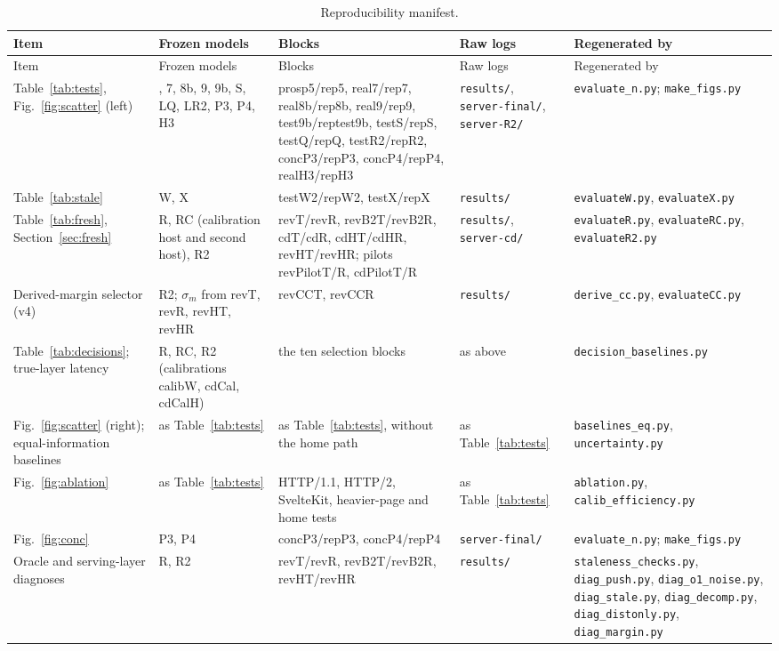 \documentclass[acmsmall,review,nonacm]{acmart}
\begin{document}
{\footnotesize\setlength{\tabcolsep}{3pt}
\begin{longtable}{>{\raggedright\arraybackslash}p{2.0cm} >{\raggedright\arraybackslash}p{2.4cm} >{\raggedright\arraybackslash}p{3.0cm} >{\raggedright\arraybackslash}p{1.9cm} >{\raggedright\arraybackslash}p{3.0cm}}
\caption{Reproducibility manifest.}\label{tab:manifest}\\
\toprule
Item & Frozen models & Blocks & Raw logs & Regenerated by \\
\midrule
\endfirsthead
\toprule
Item & Frozen models & Blocks & Raw logs & Regenerated by \\
\midrule
\endhead
Table~\ref{tab:tests}, Fig.~\ref{fig:scatter} (left) & 5, 7, 8b, 9, 9b, S, LQ, LR2, P3, P4, H3 & prosp5/rep5, real7/rep7, real8b/rep8b, real9/rep9, test9b/reptest9b, testS/repS, testQ/repQ, testR2/repR2, concP3/repP3, concP4/repP4, realH3/repH3 & \texttt{results/}, \texttt{server-final/}, \texttt{server-R2/} & \texttt{evaluate\_n.py}; \texttt{make\_figs.py} \\
Table~\ref{tab:stale} & W, X & testW2/repW2, testX/repX & \texttt{results/} & \texttt{evaluateW.py}, \texttt{evaluateX.py} \\
Table~\ref{tab:fresh}, Section~\ref{sec:fresh} & R, RC (calibration host and second host), R2 & revT/revR, revB2T/revB2R, cdT/cdR, cdHT/cdHR, revHT/revHR; pilots revPilotT/R, cdPilotT/R & \texttt{results/}, \texttt{server-cd/} & \texttt{evaluateR.py}, \texttt{evaluateRC.py}, \texttt{evaluateR2.py} \\
Derived-margin selector (v4) & R2; $\sigma_m$ from revT, revR, revHT, revHR & revCCT, revCCR & \texttt{results/} & \texttt{derive\_cc.py}, \texttt{evaluateCC.py} \\
Table~\ref{tab:decisions}; true-layer latency & R, RC, R2 (calibrations calibW, cdCal, cdCalH) & the ten selection blocks & as above & \texttt{decision\_baselines.py} \\
Fig.~\ref{fig:scatter} (right); equal-information baselines & as Table~\ref{tab:tests} & as Table~\ref{tab:tests}, without the home path & as Table~\ref{tab:tests} & \texttt{baselines\_eq.py}, \texttt{uncertainty.py} \\
Fig.~\ref{fig:ablation} & as Table~\ref{tab:tests} & HTTP/1.1, HTTP/2, SvelteKit, heavier-page and home tests & as Table~\ref{tab:tests} & \texttt{ablation.py}, \texttt{calib\_efficiency.py} \\
Fig.~\ref{fig:conc} & P3, P4 & concP3/repP3, concP4/repP4 & \texttt{server-final/} & \texttt{evaluate\_n.py}; \texttt{make\_figs.py} \\
Oracle and serving-layer diagnoses & R, R2 & revT/revR, revB2T/revB2R, revHT/revHR & \texttt{results/} & \texttt{staleness\_checks.py}, \texttt{diag\_push.py}, \texttt{diag\_o1\_noise.py}, \texttt{diag\_stale.py}, \texttt{diag\_decomp.py}, \texttt{diag\_distonly.py}, \texttt{diag\_margin.py} \\
\bottomrule
\end{longtable}
}
\end{document}
